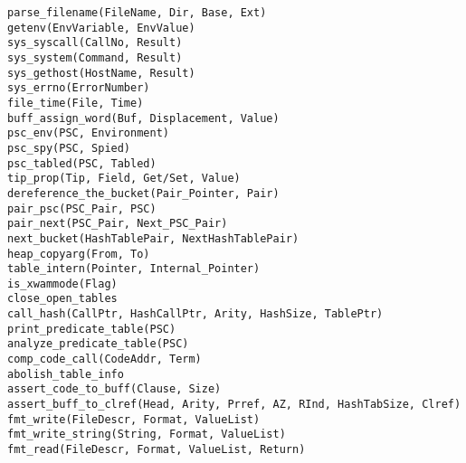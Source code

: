 \begin{tabbing}
 \> {\tt parse\_filename(FileName, Dir, Base, Ext)} \>	\\
 \> {\tt getenv(EnvVariable, EnvValue)}		\>		\\
 \> {\tt sys\_syscall(CallNo, Result)}		\>		\\
 \> {\tt sys\_system(Command, Result)}		\>		\\
 \> {\tt sys\_gethost(HostName, Result)}	\>		\\
 \> {\tt sys\_errno(ErrorNumber)}		\>		\\
 \> {\tt file\_time(File, Time)}		\>		\\
 \> {\tt buff\_assign\_word(Buf, Displacement, Value)}	\>	\\
 \> {\tt psc\_env(PSC, Environment)}		\>		\\
 \> {\tt psc\_spy(PSC, Spied)}			\>		\\
 \> {\tt psc\_tabled(PSC, Tabled)}		\>		\\
 \> {\tt tip\_prop(Tip, Field, Get/Set, Value)}	\>		\\
 \> {\tt dereference\_the\_bucket(Pair\_Pointer, Pair)} \>	\\
 \> {\tt pair\_psc(PSC\_Pair, PSC)}		\>		\\
 \> {\tt pair\_next(PSC\_Pair, Next\_PSC\_Pair)} \>		\\
 \> {\tt next\_bucket(HashTablePair, NextHashTablePair)} \>	\\
 \> {\tt heap\_copyarg(From, To)}		\>              \\
 \> {\tt table\_intern(Pointer, Internal\_Pointer)} \>		\\
 \> {\tt is\_xwammode(Flag)}			\>		\\
 \> {\tt close\_open\_tables}			\>		\\
 \> {\tt call\_hash(CallPtr, HashCallPtr, Arity, HashSize, TablePtr)} \>	\\
 \> {\tt print\_predicate\_table(PSC)}		\>		\\
 \> {\tt analyze\_predicate\_table(PSC)}	\>		\\
 \> {\tt comp\_code\_call(CodeAddr, Term)}	\>		\\
 \> {\tt abolish\_table\_info}			\>		\\
 \> {\tt assert\_code\_to\_buff(Clause, Size)}	\>		\\
 \> {\tt assert\_buff\_to\_clref(Head, Arity, Prref, AZ, RInd, HashTabSize, Clref)}	\>		\\
 \> {\tt fmt\_write(FileDescr, Format, ValueList)}	\>		\\
 \> {\tt fmt\_write\_string(String, Format, ValueList)}	\>		\\
 \> {\tt fmt\_read(FileDescr, Format, ValueList, Return)}	\>		\\
\end{tabbing}


